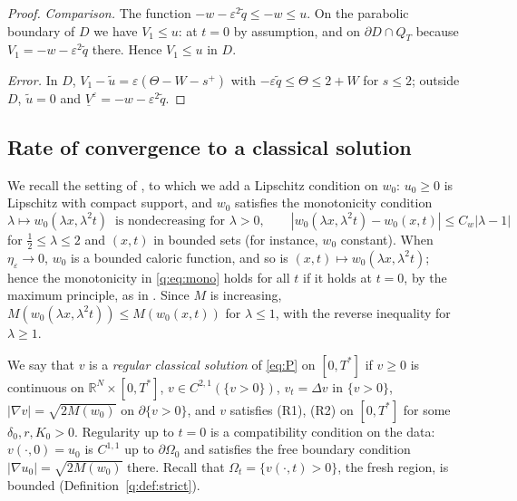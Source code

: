 \documentclass[11pt]{amsart}
\theoremstyle{definition}
\theoremstyle{remark}
\newcommand{\ve}{\varepsilon}
\newcommand{\R}{\mathbb{R}}
\begin{document}
\begin{proof}
\emph{Comparison.} The function $-w-\ve^2\tilde q\le-w\le u$. On the parabolic boundary of
$D$ we have $V_1\le u$: at $t=0$ by assumption, and on $\partial D\cap Q_T$ because
$V_1=-w-\ve^2\tilde q$ there. Hence $V_1\le u$ in $D$.

\emph{Error.} In $D$, $V_1-\tilde u=\ve(\Theta-W-s^+)$ with $-\ve\tilde q\le\Theta\le2+W$ for
$s\le2$; outside $D$, $\tilde u=0$ and $\underline V^\ve=-w-\ve^2\tilde q$.
\end{proof}

\subsection{Rate of convergence to a classical solution}

We recall the setting of \cite{FernandezBonderWolanski2004}, to which we add a
Lipschitz condition on $w_0$: $u_0\ge0$ is Lipschitz with
compact support, and $w_0$ satisfies the monotonicity condition
\begin{equation}\label{q:eq:mono}
\lambda\mapsto w_0(\lambda x,\lambda^2t)\ \text{ is nondecreasing for }\lambda>0,
\qquad |w_0(\lambda x,\lambda^2t)-w_0(x,t)|\le C_w|\lambda-1|
\end{equation}
for $\frac12\le\lambda\le2$ and $(x,t)$ in bounded sets (for instance, $w_0$ constant).
When $\eta_\ve\to0$, $w_0$ is a bounded caloric function, and so is
$(x,t)\mapsto w_0(\lambda x,\lambda^2t)$; hence the monotonicity in \eqref{q:eq:mono} holds for
all $t$ if it holds at $t=0$, by the maximum principle, as in
\cite{FernandezBonderWolanski2004}.
Since $M$ is increasing, $M(w_0(\lambda x,\lambda^2t))\le M(w_0(x,t))$ for $\lambda\le1$, with the
reverse inequality for $\lambda\ge1$.

We say that $v$ is a \emph{regular classical solution} of \eqref{eq:P} on $[0,T^*]$ if
$v\ge0$ is continuous on $\R^N\times[0,T^*]$, $v\in C^{2,1}(\{v>0\})$, $v_t=\Delta v$ in
$\{v>0\}$, $|\nabla v|=\sqrt{2M(w_0)}$ on $\partial\{v>0\}$, and $v$ satisfies (R1), (R2) on
$[0,T^*]$ for some $\delta_0,r,K_0>0$. Regularity up to $t=0$ is a compatibility
condition on the data: $v(\cdot,0)=u_0$ is $C^{1,1}$ up to
$\partial\Omega_0$ and satisfies the free boundary condition $|\nabla u_0|=\sqrt{2M(w_0)}$
there. Recall that $\Omega_t=\{v(\cdot,t)>0\}$, the fresh region, is bounded
(Definition~\ref{q:def:strict}).
\end{document}
